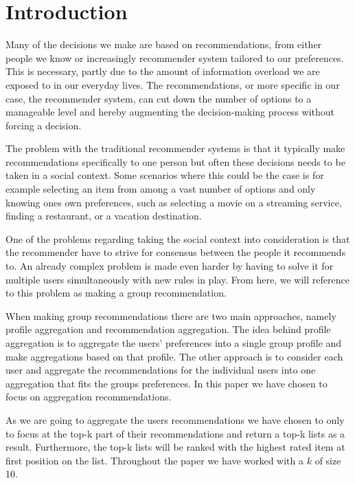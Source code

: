 \section{Introduction}
Many of the decisions we make are based on recommendations, from either people we know or increasingly recommender system tailored to our preferences. This is necessary, partly due to the amount of information overload we are exposed to in our everyday lives. The recommendations, or more specific in our case, the recommender system, can cut down the number of options to a manageable level and hereby augmenting the decision-making process without forcing a decision.

The problem with the traditional recommender systems is that it typically make recommendations specifically to one person but often these decisions needs to be taken in a social context. Some scenarios where this could be the case is for example selecting an item from among a vast number of options and only knowing ones own preferences, such as selecting a movie on a streaming service, finding a restaurant, or a vacation destination.

One of the problems regarding taking the social context into consideration is that the recommender have to strive for consensus between the people it recommends to. An already complex problem is made even harder by having to solve it for multiple users simultaneously with new rules in play. From here, we will reference to this problem as making a group recommendation.

When making group recommendations there are two main approaches, namely profile aggregation and recommendation aggregation\cite{recbook:profilvsrec}. The idea behind profile aggregation is to aggregate the users' preferences into a single group profile and make aggregations based on that profile. The other approach is to consider each user and aggregate the recommendations for the individual users into one aggregation that fits the groups preferences. In this paper we have chosen to focus on aggregation recommendations.


As we are going to aggregate the users recommendations we have chosen to only to focus at the top-k part of their recommendations and return a top-k lists as a result. Furthermore, the top-k lists will be ranked with the highest rated item at first position on the list. Throughout the paper we have worked with a $k$ of size 10.

